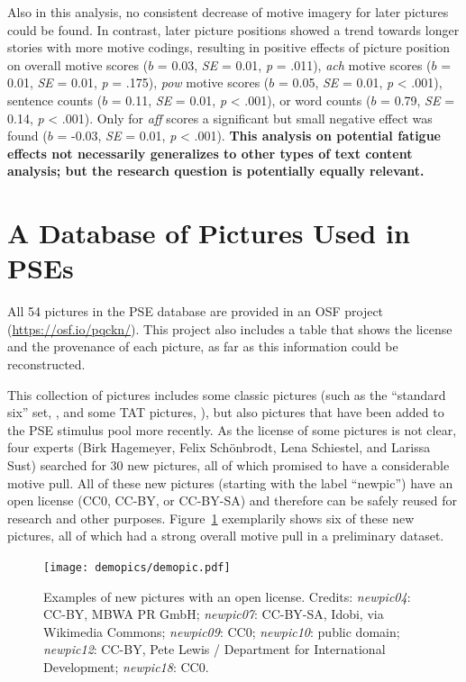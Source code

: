 \documentclass[man,a4paper,mask]{apa6}\usepackage[]{graphicx}\usepackage[]{color}
\newcommand{\added}[1]{\textcolor{colour_added}{\bf{#1}}}
\begin{document}
Also in this analysis, no consistent decrease of motive imagery for later pictures could be found. In contrast, later picture positions showed a trend towards longer stories with more motive codings, resulting in positive effects of picture position on overall motive scores ($b$ = 0.03, \emph{SE} = 0.01, \emph{p} = .011), \emph{ach} motive scores ($b$ = 0.01, \emph{SE} = 0.01, \emph{p} = .175), \emph{pow} motive scores ($b$ = 0.05, \emph{SE} = 0.01, \emph{p} < .001), sentence counts ($b$ = 0.11, \emph{SE} = 0.01, \emph{p} < .001), or word counts ($b$ = 0.79, \emph{SE} = 0.14, \emph{p} < .001). Only for \emph{aff} scores a significant but small negative effect was found ($b$ = -0.03, \emph{SE} = 0.01, \emph{p} < .001). \added{This analysis on potential fatigue effects not necessarily generalizes to other types of text content analysis; but the research question is potentially equally relevant.}

\section{A Database of Pictures Used in PSEs}

All 54 pictures in the PSE database are provided in an OSF project (\url{https://osf.io/pqckn/}). This project also includes a table that shows the license and the provenance of each picture, as far as this information could be reconstructed. 

This collection of pictures includes some classic pictures (such as the ``standard six'' set, , and some TAT pictures, ), but also pictures that have been added to the PSE stimulus pool more recently. As the license of some pictures is not clear, four experts (Birk Hagemeyer, Felix Schönbrodt, Lena Schiestel, and Larissa Sust) searched for 30 new pictures, all of which promised to have a considerable motive pull. All of these new pictures (starting with the label ``newpic'') have an open license (CC0, CC-BY, or CC-BY-SA) and therefore can be safely reused for research and other purposes. Figure~\ref{fig:demopic} exemplarily shows six of these new pictures, all of which had a strong overall motive pull in a preliminary dataset.


\begin{figure}[htp]
  \begin{center}
	\texttt{[image: demopics/demopic.pdf]}
  \end{center}
  \caption{Examples of new pictures with an open license. Credits: \emph{newpic04}: CC-BY, MBWA PR GmbH; \emph{newpic07}: CC-BY-SA, Idobi, via Wikimedia Commons; \emph{newpic09}: CC0; \emph{newpic10}: public domain; \emph{newpic12}: CC-BY, Pete Lewis / Department for International Development; \emph{newpic18}: CC0.}
  \label{fig:demopic}
\end{figure}
\end{document}
